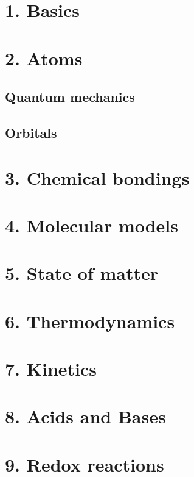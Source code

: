 \documentclass{cheatsheet}
\author{Noa Sendlhofer \& Christian Leser \\ nsendlhofer \& cleser}
\begin{document}
\section{1. Basics}
	

\section{2. Atoms}
	\subsection{Quantum mechanics}
	
	\subsection{Orbitals}
	

\section{3. Chemical bondings}
	

\section{4. Molecular models}
	

\section{5. State of matter}
	

\section{6. Thermodynamics}
	

\section{7. Kinetics}
	

\section{8. Acids and Bases}
	

\section{9. Redox reactions}
	
\end{document}

